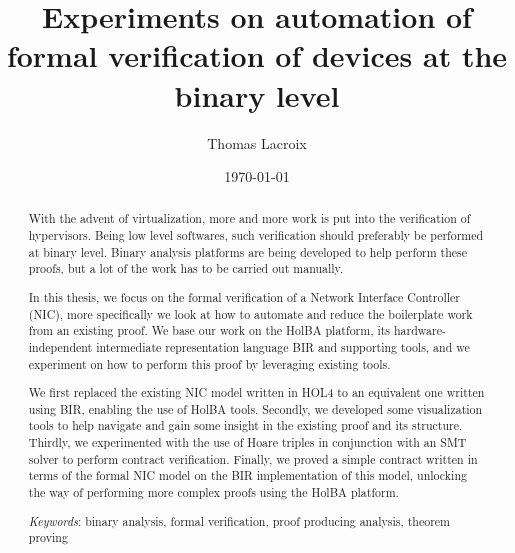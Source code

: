 \documentclass{kththesis}
\title{Experiments on automation of formal verification of devices at the binary level}
\author{Thomas Lacroix}
\date{\today}
\begin{document}
\frontmatter %

\titlepage

\begin{abstract}
  With the advent of virtualization, more and more work is put into the verification of hypervisors. Being low level softwares, such verification should preferably be performed at binary level. Binary analysis platforms are being developed to help perform these proofs, but a lot of the work has to be carried out manually.
  
  In this thesis, we focus on the formal verification of a Network Interface Controller (NIC), more specifically we look at how to automate and reduce the boilerplate work from an existing proof. We base our work on the HolBA platform, its hardware-independent intermediate representation language BIR and supporting tools, and we experiment on how to perform this proof by leveraging existing tools.
  
  We first replaced the existing NIC model written in HOL4 to an equivalent one written using BIR, enabling the use of HolBA tools. Secondly, we developed some visualization tools to help navigate and gain some insight in the existing proof and its structure. Thirdly, we experimented with the use of Hoare triples in conjunction with an SMT solver to perform contract verification. Finally, we proved a simple contract written in terms of the formal NIC model on the BIR implementation of this model, unlocking the way of performing more complex proofs using the HolBA platform.
  
  \textit{Keywords}: binary analysis, formal verification, proof producing analysis, theorem proving
\end{abstract}
\end{document}
